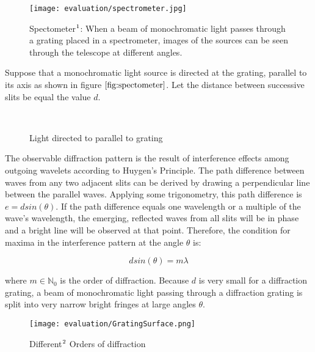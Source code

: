 \begin{figure}[H]
  \centering
  \texttt{[image: evaluation/spectrometer.jpg]}
  \caption[Spectometer]{Spectometer$\footnotemark$: When a beam of monochromatic light passes through a grating placed in a spectrometer, images of the sources can be seen through the telescope at different angles.}
\label{fig:spectometer}
\end{figure}

Suppose that a monochromatic light source is directed at the grating, parallel to its axis as shown in figure $\ref{fig:spectometer}$. Let the distance between successive slits be equal the value $d$.

\begin{figure}[H]
  \centering
~  

\caption[Idealized Diffraction Grating]{Light directed to parallel to grating}
\label{fig:lighthitsgrating}
\end{figure}

The observable diffraction pattern is the result of interference effects among outgoing wavelets according to Huygen's Principle. The path difference between waves from any two adjacent slits can be derived by drawing a perpendicular line between the parallel waves. Applying some trigonometry, this path difference is $e = d sin(\theta)$. If the path difference equals one wavelength or a multiple of the wave's wavelength, the emerging, reflected waves from all slits will be in phase and a bright line will be observed at that point. Therefore, the condition for maxima in the interference pattern at the angle $\theta$ is: 

\begin{equation}
 d sin(\theta) = m \lambda 
\label{eq:simplegratingequation}
\end{equation}

where $m \in \mathds{N}_0$ is the order of diffraction. Because $d$ is very small for a diffraction grating, a beam of monochromatic light passing through a diffraction grating is split into very narrow bright fringes at large angles $\theta$.

\begin{figure}[H]
  \centering
  \texttt{[image: evaluation/GratingSurface.png]}
  \caption[Diffraction Orders]{Different$\footnotemark$ Orders of diffraction}
\label{fig:gratingdiffractionorders}
\end{figure}

